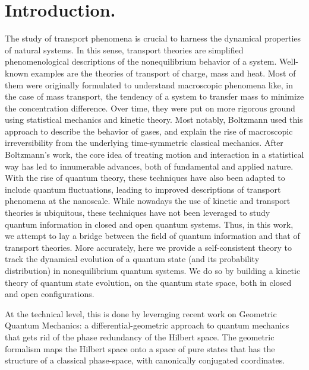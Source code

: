 \documentclass[draft,nofootinbib,pre,twocolumn,showpacs,showkeys,preprintnumbers,floatfix]{revtex4-1}
\newcommand{\1}{\mathbbm{1}}
\begin{document}




\section*{Introduction.} The study of transport phenomena is crucial to harness 
the dynamical properties of natural systems. In this sense, transport theories are 
simplified phenomenological descriptions of the nonequilibrium behavior of a system. 
Well-known examples are the theories of transport of charge, mass and heat. Most of them were 
originally formulated to understand macroscopic phenomena like, in the case of 
mass transport, the tendency of a system to transfer mass to minimize the 
concentration difference. Over time, they were put on more rigorous ground using 
statistical mechanics and kinetic theory. Most notably, Boltzmann used this approach
to describe the behavior of gases, and explain the rise of macroscopic irreversibility from 
the underlying time-symmetric classical mechanics. After Boltzmann's work, the core idea 
of treating motion and interaction in a statistical way has led to innumerable advances, both 
of fundamental and applied nature. With the rise of quantum theory, these techniques have 
also been adapted to include quantum fluctuations, leading to improved descriptions of 
transport phenomena at the nanoscale.
While nowadays the use of kinetic and transport theories is ubiquitous, these techniques
have not been leveraged to study quantum information in closed and open quantum systems. 
Thus, in this work, we attempt to lay a bridge between the field of quantum information and 
that of transport theories. More accurately, here we provide a self-consistent theory to track
the dynamical evolution of a quantum state (and its probability distribution) in nonequilibrium
quantum systems. We do so by building a kinetic theory of quantum state evolution, on the quantum 
state space, both in closed and open configurations.

At the technical level, this is done by leveraging recent work \cite{Anza20a,Anza20b} on 
Geometric Quantum Mechanics: a differential-geometric approach to quantum mechanics that 
gets rid of the phase redundancy of the Hilbert space. The geometric formalism maps the Hilbert 
space onto a space of pure states that has the structure of a classical phase-space, with 
canonically conjugated coordinates.
\end{document}
